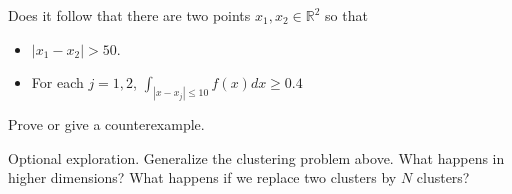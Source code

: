 \documentclass{amsart}
\newcommand{\RR}{\mathbb{R}}
\begin{document}
Does it follow that there are two points $x_1, x_2 \in \RR^2$ so that 


\begin{itemize}

\item $| x_1 - x_2| > 50$.

\item For each $j = 1,2$,  $\int_{|x - x_j| \le 10} f(x) dx \ge 0.4$

\end{itemize}

Prove or give a counterexample.

\vskip10pt

Optional exploration.   Generalize the clustering problem above.   What happens in higher dimensions?  What happens if we replace two clusters by $N$ clusters?
\end{document}
